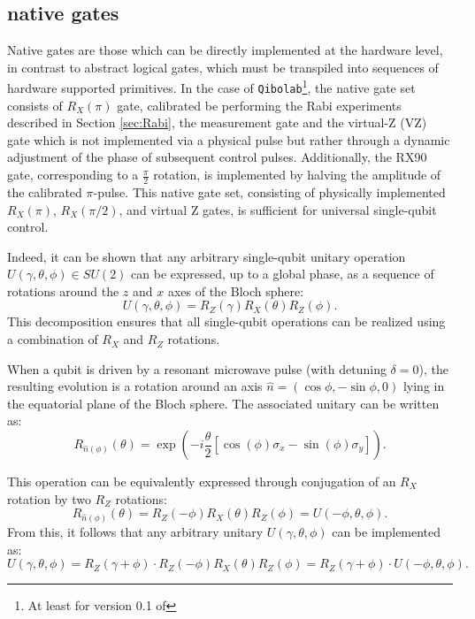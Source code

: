 \subsection{\Qibolab native gates}\label{subsec:native_gates}
Native gates are those which can be directly implemented at the hardware level, in contrast to abstract logical gates, which must be transpiled into sequences of hardware supported primitives. 
In the case of \texttt{Qibolab}\footnote{At least for version 0.1 of \Qibolab}, the native gate set consists of $R_X(\pi)$ gate, calibrated be performing the Rabi experiments described in Section \ref{sec:Rabi}, the measurement gate and the virtual-Z (VZ) gate which is not implemented via a physical pulse but rather through a dynamic adjustment of the phase of subsequent control pulses. 
Additionally, the RX90 gate, corresponding to a $\frac{\pi}{2}$ rotation, is implemented by halving the amplitude of the calibrated $\pi$-pulse.
This native gate set, consisting of physically implemented $R_X(\pi)$, $R_X(\pi/2)$, and virtual Z gates, is sufficient for universal single-qubit control.

Indeed, it can be shown that any arbitrary single-qubit unitary operation $ U(\gamma, \theta, \phi) \in SU(2) $ can be expressed, up to a global phase, as a sequence of rotations around the $z$ and $x$ axes of the Bloch sphere:
\begin{equation}
U(\gamma, \theta, \phi) = R_Z(\gamma) R_X(\theta) R_Z(\phi).
\end{equation}
This decomposition ensures that all single-qubit operations can be realized using a combination of $ R_X $ and $ R_Z $ rotations. 

When a qubit is driven by a resonant microwave pulse (with detuning $ \delta = 0 $), the resulting evolution is a rotation around an axis $\hat{n} = (\cos\phi, -\sin\phi, 0)$ lying in the equatorial plane of the Bloch sphere. 
The associated unitary can be written as:
\begin{equation}
R_{\hat{n}(\phi)}(\theta) = \exp\left( -i \frac{\theta}{2} \left[ \cos(\phi)\sigma_x - \sin(\phi)\sigma_y \right] \right).
\end{equation}

This operation can be equivalently expressed through conjugation of an $R_X$ rotation by two $R_Z$ rotations:
\begin{equation}
R_{\hat{n}(\phi)}(\theta) = R_Z(-\phi) R_X(\theta) R_Z(\phi) = U(-\phi, \theta, \phi).
\end{equation}
From this, it follows that any arbitrary unitary $ U(\gamma, \theta, \phi) $ can be implemented as:
\begin{equation}
U(\gamma, \theta, \phi) = R_Z(\gamma + \phi) \cdot R_Z(-\phi) R_X(\theta) R_Z(\phi) = R_Z(\gamma + \phi) \cdot U(-\phi, \theta, \phi).
\end{equation}

